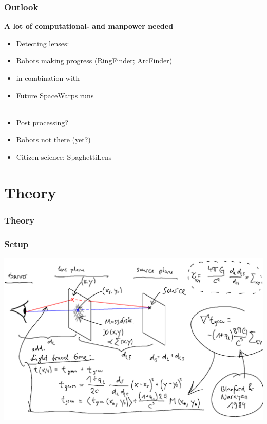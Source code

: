 \documentclass{beamer}
\newcommand{\aitem}{\item[$\Rightarrow$]}
\newcommand{\nitem}{\item[]}
\begin{document}
\begin{frame}
  \frametitle{Outlook}
	
	\textbf{A lot of computational- and manpower needed}
	
  \begin{itemize}
			
		\nitem Detecting lenses:
		\item Robots making progress (RingFinder; ArcFinder)
		\nitem in combination with
		\item Future SpaceWarps runs \\~\\
		
		\nitem Post processing?
		\item Robots not there (yet?)
		\aitem Citizen science: SpaghettiLens

  \end{itemize}
\end{frame}




\section{Theory}
\begin{frame}
  \frametitle{Theory}

\end{frame}

\begin{frame}
	\frametitle{Setup}
	\includegraphics[width=\textwidth]{imgs/skizze_theo}
\end{frame}
\end{document}
